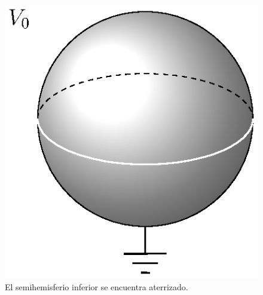 \begin{enumerate}
\begin{figure}[!ht]
   \includegraphics[scale=0.8]{Imagenes/esfera_5.eps}
    \caption{El semihemisferio inferior se encuentra aterrizado.}
    \label{fig:esfera_aterrizada}
\end{figure}
\end{enumerate}
